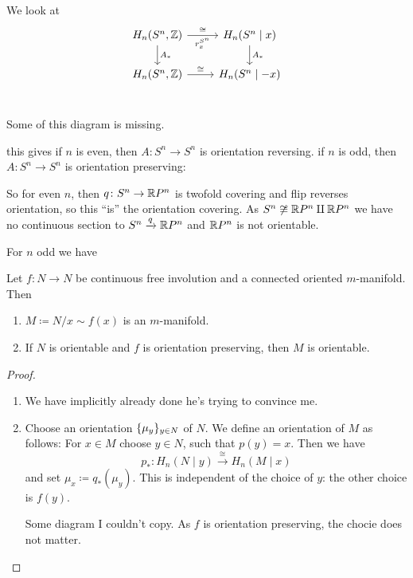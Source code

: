 \documentclass[language=english]{TemplateLecture}
\begin{document}
We look at
\[\begin{tikzcd}
    H_n(S^n, \IZ) \ar[d, "A_*"] \ar[r, "\cong", "r_x^{S^n}"'] & H_n(S^n \mid x) \ar[d, "A_*"] \\
    H_n(S^n, \IZ) \ar[r, "\cong"] & H_n(S^n \mid -x) \\
\end{tikzcd}\]

Some of this diagram is missing.

this gives if \(n\) is even, then \(A \colon S^n \to S^n\) is orientation reversing. if \(n\) is odd, then \(A\colon S^n \to S^n\) is orientation preserving:

 So for even \(n\), then \(q\colon S^n \to \mathbb{R} P^n\) is twofold covering and flip reverses orientation, so this \enquote{is} the orientation covering. As \(S^n \not \cong \mathbb{R} P^n \amalg \mathbb{R} P^n\) we have no continuous section to \(S^n \xrightarrow{q} \mathbb{R} P^n\) and \(\mathbb{R} P^n\) is not orientable.

 For \(n\) odd we have

 \begin{proposition}
    Let \(f\colon N \to N\) be continuous free involution and a connected oriented \(m\)-manifold. Then
    \begin{enumerate}
        \item \(M \coloneq N/x\sim f(x)\) is an \(m\)-manifold.
        \item If \(N\) is orientable and \(f\) is orientation preserving, then \(M\) is orientable.
    \end{enumerate}
 \end{proposition}

 \begin{proof}
    \begin{enumerate}
        \item We have implicitly already done he's trying to convince me.
        \item Choose an orientation \(\{\mu_y\}_{y \in N}\) of \(N\). We define an orientation of \(M\) as follows: For \(x \in M\) choose \(y \in N\), such that \(p(y) = x\). Then we have
        \[p_*\colon H_n(N\mid y) \xrightarrow{\cong} H_n(M \mid x)\]
        and set \(\mu_x \coloneq q_*(\mu_y)\). This is independent of the choice of \(y\): the other choice is \(f(y)\).

        Some diagram I couldn't copy. As \(f\) is orientation preserving, the chocie does not matter.
    \end{enumerate}
 \end{proof}
\end{document}
